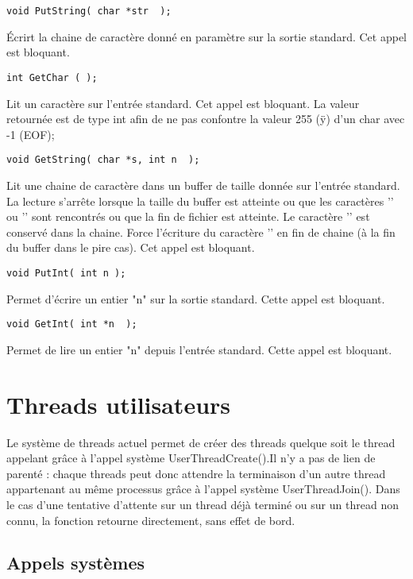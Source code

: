 \documentclass{report}
\begin{document}
\begin{verbatim}
void PutString( char *str  );
\end{verbatim}
Écrirt la chaine de caractère donné en paramètre sur la sortie standard. Cet appel est bloquant.

\begin{verbatim}
int GetChar ( );
\end{verbatim}
Lit un caractère sur l'entrée standard. Cet appel est bloquant. La valeur retournée est de type int afin de ne pas confontre la valeur 255 (ÿ) d'un char avec -1 (EOF);

\begin{verbatim}
void GetString( char *s, int n  );
\end{verbatim}
Lit une chaine de caractère dans un buffer de taille donnée sur l'entrée standard. La lecture s'arrête lorsque la taille du buffer est atteinte ou que les caractères '\0' ou '\n' sont rencontrés ou que la fin de fichier est atteinte. Le caractère '\n' est conservé dans la chaine. Force l'écriture du caractère '\0' en fin de chaine (à la fin du buffer dans le pire cas). Cet appel est bloquant.

\begin{verbatim}
void PutInt( int n );
\end{verbatim}
Permet d'écrire un entier "n" sur la sortie standard. Cette appel est bloquant.


\begin{verbatim}
void GetInt( int *n  );
\end{verbatim}
Permet de lire un entier  "n" depuis l'entrée standard. Cette appel est bloquant.

\section{Threads utilisateurs}
Le système de threads actuel permet de créer des threads quelque soit le thread appelant grâce à l'appel système UserThreadCreate().Il n'y a pas de lien de parenté : chaque threads peut donc attendre la terminaison d'un autre thread appartenant au même processus grâce à l'appel système UserThreadJoin(). Dans le cas d'une tentative d'attente sur un thread déjà terminé ou sur un thread non connu, la fonction retourne directement, sans effet de bord.

\subsection{Appels systèmes}
\end{document}
